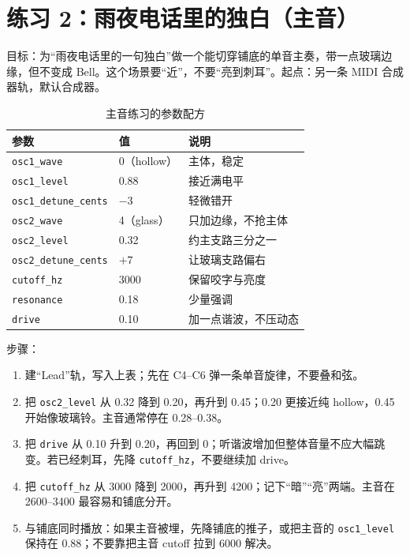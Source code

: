 \section{练习 2：雨夜电话里的独白（主音）}

目标：为“雨夜电话里的一句独白”做一个能切穿铺底的单音主奏，带一点玻璃边缘，但不变成 Bell。这个场景要“近”，不要“亮到刺耳”。起点：另一条 MIDI 合成器轨，默认合成器。

\begin{table}[htbp]
\centering
\small
\begin{tabular}{@{}lll@{}}
\hline
参数 & 值 & 说明 \\
\hline
\texttt{osc1\_wave} & 0（hollow） & 主体，稳定 \\
\texttt{osc1\_level} & 0.88 & 接近满电平 \\
\texttt{osc1\_detune\_cents} & $-3$ & 轻微错开 \\
\texttt{osc2\_wave} & 4（glass） & 只加边缘，不抢主体 \\
\texttt{osc2\_level} & 0.32 & 约主支路三分之一 \\
\texttt{osc2\_detune\_cents} & $+7$ & 让玻璃支路偏右 \\
\texttt{cutoff\_hz} & 3000 & 保留咬字与亮度 \\
\texttt{resonance} & 0.18 & 少量强调 \\
\texttt{drive} & 0.10 & 加一点谐波，不压动态 \\
\hline
\end{tabular}
\caption{主音练习的参数配方}
\label{tab:lead-recipe}
\end{table}

步骤：

\begin{enumerate}
  \item 建“Lead”轨，写入上表；先在 C4–C6 弹一条单音旋律，不要叠和弦。
  \item 把 \texttt{osc2\_level} 从 0.32 降到 0.20，再升到 0.45；0.20 更接近纯 hollow，0.45 开始像玻璃铃。主音通常停在 0.28–0.38。
  \item 把 \texttt{drive} 从 0.10 升到 0.20，再回到 0；听谐波增加但整体音量不应大幅跳变。若已经刺耳，先降 \texttt{cutoff\_hz}，不要继续加 drive。
  \item 把 \texttt{cutoff\_hz} 从 3000 降到 2000，再升到 4200；记下“暗”“亮”两端。主音在 2600–3400 最容易和铺底分开。
  \item 与铺底同时播放：如果主音被埋，先降铺底的推子，或把主音的 \texttt{osc1\_level} 保持在 0.88；不要靠把主音 cutoff 拉到 6000 解决。
\end{enumerate}

